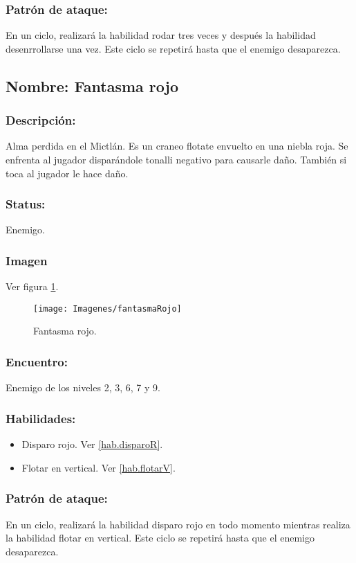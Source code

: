 \documentclass[11pt,letterpaper]{article}
\begin{document}
\subsubsection{Patrón de ataque:}
En un ciclo, realizará la habilidad rodar tres veces y después la habilidad desenrrollarse una vez. Este ciclo se repetirá hasta que el enemigo desaparezca.

\subsection{Nombre: Fantasma rojo}   \label{per.fantasmaR}
\subsubsection{Descripción:}
Alma perdida en el Mictlán. Es un craneo flotate envuelto en una niebla roja.
Se enfrenta al jugador disparándole tonalli negativo para causarle daño. También si toca al jugador le hace daño. 
\subsubsection{Status:}
Enemigo.
\subsubsection{Imagen}
Ver figura \ref{fig:fantasmaR}.
\begin{figure}
	\centering
	\texttt{[image: Imagenes/fantasmaRojo]}
	\caption{Fantasma rojo.}
	\label{fig:fantasmaR}
\end{figure} 
\subsubsection{Encuentro:}
Enemigo de los niveles 2, 3, 6, 7 y 9.
\subsubsection{Habilidades:}
\begin{itemize}
	\item Disparo rojo. Ver \ref{hab.disparoR}.
	\item Flotar en vertical. Ver \ref{hab.flotarV}.
\end{itemize}
\subsubsection{Patrón de ataque:}
En un ciclo, realizará la habilidad disparo rojo en todo momento mientras realiza la habilidad flotar en vertical. Este ciclo se repetirá hasta que el enemigo desaparezca.
\end{document}
